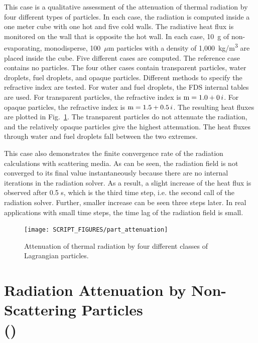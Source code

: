 \documentclass[11pt]{book}
\begin{document}
This case is a qualitative assessment of the attenuation of thermal radiation by four different types of particles. In each case, the radiation is computed inside a one meter cube with one hot and five cold walls. The radiative heat flux is monitored on the wall that is opposite the hot wall. In each case, 10~g of non-evaporating, monodisperse, 100~$\mu$m particles with a density of 1,000~\si{kg/m^3} are placed inside the cube. Five different cases are computed. The reference case contains no particles. The four other cases contain transparent particles, water droplets, fuel droplets, and opaque particles. Different methods to specify the refractive index are tested. For water and fuel droplets, the FDS internal tables are used. For transparent particles, the refractive index is $\hbox{m} = 1.0+0\,i$. For opaque particles, the refractive index is $\hbox{m} = 1.5+0.5 \,i$. The resulting heat fluxes are plotted in Fig.~\ref{part_attenuation_figure}. The transparent particles do not attenuate the radiation, and the relatively opaque particles give the highest attenuation. The heat fluxes through water and fuel droplets fall between the two extremes.

This case also demonstrates the finite convergence rate of the radiation calculations with scattering media. As can be seen, the radiation field is not converged to its final value instantaneously because there are no internal iterations in the radiation solver. As a result, a slight increase of the heat flux is observed after 0.5 s, which is the third time step, i.e. the second call of the radiation solver. Further, smaller increase can be seen three steps later. In real applications with small time steps, the time lag of the radiation field is small.

\begin{figure}[h]
\centering
\texttt{[image: SCRIPT\_FIGURES/part\_attenuation]}
\caption[Radiation attenuation by Lagrangian particles]{Attenuation of thermal radiation by four different classes of Lagrangian particles.}
\label{part_attenuation_figure}
\end{figure}


\section{Radiation Attenuation by Non-Scattering Particles \\ (\texorpdfstring{}{radiation\_gas-veg\_consistency})}
\label{radiation_gas-veg_consistency}
\label{radiation_gas-veg_consistency_gas}
\label{radiation_gas-veg_consistency_veg}
\end{document}
